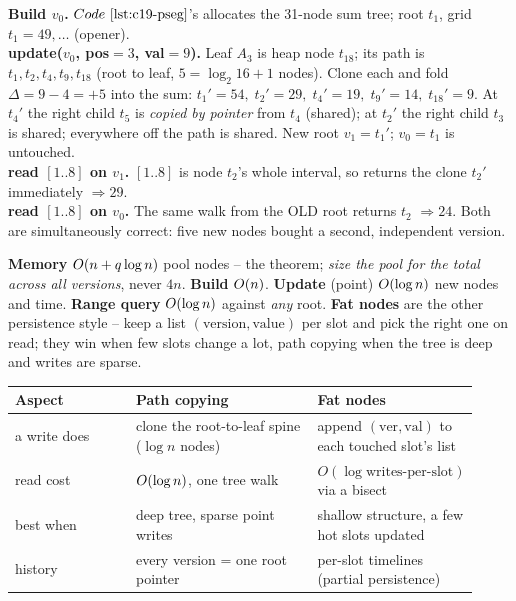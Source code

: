 \begin{tracebox}[build v0; clone the path for A(3)=9 into v1; read range 1..8 on BOTH versions]
\textbf{Build \(v_0\).} \(\coderef{c19-pseg}\)'s  allocates the 31-node sum tree; root \(t_1\), grid \(t_1{=}49,\dots\) (opener).\\
\textbf{update(\(v_0\), pos\(=3\), val\(=9\)).} Leaf \(A_3\) is heap node \(t_{18}\); its path is \(t_1, t_2, t_4, t_9, t_{18}\) (root to leaf, \(5=\log_2 16{+}1\) nodes).  Clone each and fold \(\Delta = 9-4 = +5\) into the sum: \(t_1'{=}54,\; t_2'{=}29,\; t_4'{=}19,\; t_9'{=}14,\; t_{18}'{=}9\).  At \(t_4'\) the right child \(t_5\) is \emph{copied by pointer} from \(t_4\) (shared); at \(t_2'\) the right child \(t_3\) is shared; everywhere off the path is shared.  New root \(v_1 = t_1'\); \(v_0=t_1\) is untouched.\\
\textbf{read \([1..8]\) on \(v_1\).} \([1..8]\) is node \(t_2\)'s whole interval, so  returns the clone \(t_2'\) immediately \(\Rightarrow \boxed{29}\).\\
\textbf{read \([1..8]\) on \(v_0\).} The same walk from the OLD root returns \(t_2\) \(\Rightarrow \boxed{24}\).  Both are simultaneously correct: five new nodes bought a second, independent version.
\end{tracebox}

\begin{complexitybox}
\textbf{Memory} \(O(n + q\log n)\) pool nodes -- the theorem; \emph{size the pool for the total across all versions}, never \(4n\).  \textbf{Build} \(O(n)\).  \textbf{Update} (point) \(O(\log n)\) new nodes and time.  \textbf{Range query} \(O(\log n)\) against \emph{any} root.  \textbf{Fat nodes} are the other persistence style -- keep a list \((\text{version},\text{value})\) per slot and pick the right one on read; they win when few slots change a lot, path copying when the tree is deep and writes are sparse.
\end{complexitybox}

\begin{center}\renewcommand{\arraystretch}{1.2}\setlength{\tabcolsep}{4pt}
\begin{tabular}{@{}p{0.24\linewidth} p{0.36\linewidth} p{0.32\linewidth}@{}}
\toprule
\textbf{Aspect} & \textbf{Path copying} & \textbf{Fat nodes}\\
\midrule
a write does & clone the root-to-leaf spine (\(\log n\) nodes) & append \((\text{ver},\text{val})\) to each touched slot's list \\
read cost & \(O(\log n)\), one tree walk & \(O(\log \text{writes-per-slot})\) via a bisect \\
best when & deep tree, sparse point writes & shallow structure, a few hot slots updated \\
history & every version = one root pointer & per-slot timelines (partial persistence) \\
\bottomrule
\end{tabular}
\end{center}

